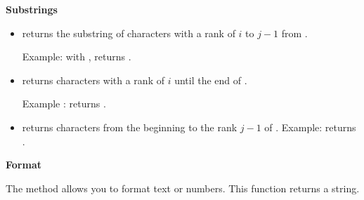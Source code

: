 \documentclass[11pt,class=report,crop=false]{standalone}
\begin{document}
\bigskip

\textbf{Substrings}

\begin{itemize}
  \item {}\quad returns the substring of characters with a rank of $i$ to $j-1$ from .
  
   Example: with ,  returns .
   
  \item {}\quad returns characters with a rank of $i$ until the end of . 
  
  Example :
   returns .
  
  \item{}\quad returns characters from the beginning to the rank $j-1$ of . Example:  returns .
  
\end{itemize}


\bigskip
\textbf{Format}

The  method allows you to format text or numbers. This function returns a string.
\end{document}
